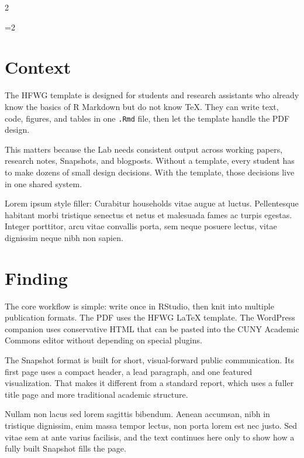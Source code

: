 \documentclass[12pt]{article}
\newif\ifhfwghfwg
\newif\ifhfwganon
\newcommand{\hfwgmaincolumns}{1}
\begin{document}
\begin{paracol}{2}
\ifhfwghfwg\else
\ifnum\hfwgmaincolumns=2\relax
  \twocolumn
\fi
\fi

\ifhfwganon
\begingroup
\small
\noindent\textit{This manuscript is set to anonymous mode. Identifying metadata fields are suppressed on the title page.}\par
\endgroup
\vspace{1em}
\fi

\section{Context}\label{context}

The HFWG template is designed for students and research assistants who
already know the basics of R Markdown but do not know TeX. They can
write text, code, figures, and tables in one \texttt{.Rmd} file, then
let the template handle the PDF design.

This matters because the Lab needs consistent output across working
papers, research notes, Snapshots, and blogposts. Without a template,
every student has to make dozens of small design decisions. With the
template, those decisions live in one shared system.

Lorem ipsum style filler: Curabitur households vitae augue at luctus.
Pellentesque habitant morbi tristique senectus et netus et malesuada
fames ac turpis egestas. Integer porttitor, arcu vitae convallis porta,
sem neque posuere lectus, vitae dignissim neque nibh non sapien.

\section{Finding}\label{finding}

The core workflow is simple: write once in RStudio, then knit into
multiple publication formats. The PDF uses the HFWG LaTeX template. The
WordPress companion uses conservative HTML that can be pasted into the
CUNY Academic Commons editor without depending on special plugins.

The Snapshot format is built for short, visual-forward public
communication. Its first page uses a compact header, a lead paragraph,
and one featured visualization. That makes it different from a standard
report, which uses a fuller title page and more traditional academic
structure.

Nullam non lacus sed lorem sagittis bibendum. Aenean accumsan, nibh in
tristique dignissim, enim massa tempor lectus, non porta lorem est nec
justo. Sed vitae sem at ante varius facilisis, and the text continues
here only to show how a fully built Snapshot fills the page.


\end{paracol}
\end{document}

